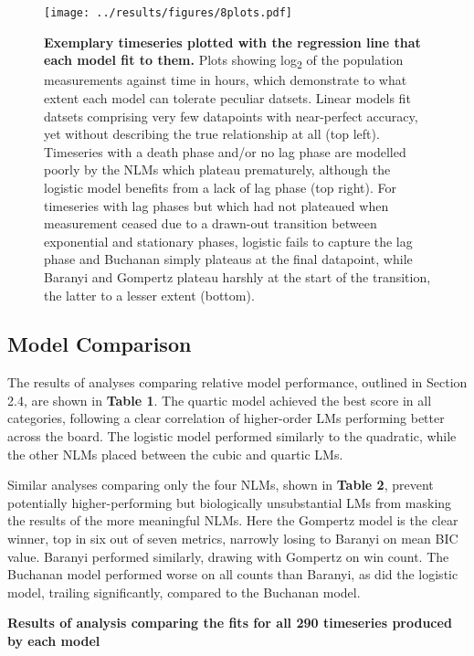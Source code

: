 \documentclass[11pt]{article}
\begin{document}
\begin{figure}[htb!]
    \centering
    \texttt{[image: ../results/figures/8plots.pdf]} 
    \caption{\textbf{Exemplary timeseries plotted with the regression line that each model fit to them.}  Plots showing log\textsubscript{2} of the population measurements against time in hours, which demonstrate to what extent each model can tolerate peculiar datsets. Linear models fit datsets comprising very few datapoints with near-perfect accuracy, yet without describing the true relationship at all (top left). Timeseries with a death phase and/or no lag phase are modelled poorly by the NLMs which plateau prematurely, although the logistic model benefits from a lack of lag phase (top right). For timeseries with lag phases but which had not plateaued when measurement ceased due to a drawn-out transition between exponential and stationary phases, logistic fails to capture the lag phase and Buchanan simply plateaus at the final datapoint, while Baranyi and Gompertz plateau harshly at the start of the transition, the latter to a lesser extent (bottom).}
\end{figure}


\subsection{Model Comparison}

The results of analyses comparing relative model performance, outlined in Section 2.4, are shown in \textbf{Table 1}. The quartic model achieved the best score in all categories, following a clear correlation of higher-order LMs performing better across the board. The logistic model performed similarly to the quadratic, while the other NLMs placed between the cubic and quartic LMs. 

Similar analyses comparing only the four NLMs, shown in \textbf{Table 2}, prevent potentially higher-performing but biologically unsubstantial LMs from masking the results of the more meaningful NLMs. Here the Gompertz model is the clear winner, top in six out of seven metrics, narrowly losing to Baranyi on mean BIC value. Baranyi performed similarly, drawing with Gompertz on win count. The Buchanan model performed worse on all counts than Baranyi, as did the logistic model, trailing significantly, compared to the Buchanan model. 

\begin{table}[htb]
    \centering
    \caption{\textbf{Results of analysis comparing the fits for all 290 timeseries produced by each model}}
\end{table}
\end{document}
